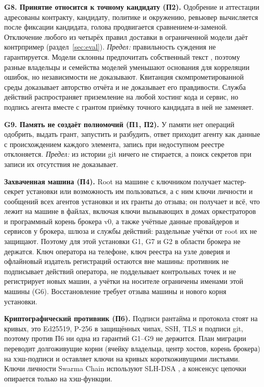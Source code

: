\documentclass[10pt,a4paper]{article}
\begin{document}
\textbf{G8. Принятие относится к точному кандидату (П2).} Одобрение и аттестации адресованы контракту, кандидату, политике и окружению, ревьювер вычисляется после фиксации кандидата, голова продвигается сравнением-и-заменой. Отключение любого из четырёх правил доставки в ограниченной модели даёт контрпример (раздел~\ref{sec:eval}). \emph{Предел:} правильность суждения не гарантируется. Модели склонны предпочитать собственный текст \cite{selfpref,llmjudge}, поэтому разные владельцы и семейства моделей уменьшают основания для корреляции ошибок, но независимости не доказывают. Квитанция скомпрометированной среды доказывает авторство отчёта и не доказывает его правдивости. Служба действий распространяет приземление на любой хостинг кода и сервис, но подпись агента вместе с грантом приёмку точного кандидата в ней не заменяет.

\textbf{G9. Память не создаёт полномочий (П1, П2).} У памяти нет операций одобрить, выдать грант, запустить и разбудить, ответ приходит агенту как данные с происхождением каждого элемента, запись при недоступном реестре отклоняется. \emph{Предел:} из истории git ничего не стирается, а поиск секретов при записи их отсутствия не доказывает.

\textbf{Захваченная машина (П4).} Root на машине с ключником получает мастер-секрет установки или возможность им пользоваться, а с ним ключи личности и сообщений всех агентов установки и их гранты до отзыва; он получает и всё, что лежит на машине в файлах, включая ключи вызывающих в домах оркестраторов и программный корень брокера v0, а также учётные данные провайдеров и сервисов у брокера, шлюза и службы действий: раздельные учётки от root их не защищают. Поэтому для этой установки G1, G7 и G2 в области брокера не держатся. Ключ оператора на телефоне, ключ реестра на узле доверия и офлайновый издатель регистраций остаются вне машины: противник не подписывает действий оператора, не подделывает контрольных точек и не регистрирует новых машин, а учётки на носителе ограничены именами этой машины (G6). Восстановление требует отзыва машины и нового корня установки.

\textbf{Криптографический противник (П6).} Подписи рантайма и протокола стоят на кривых, это Ed25519, P-256 в защищённых чипах, SSH, TLS и подписи git, поэтому против П6 ни одна из гарантий G1--G9 не держится. План миграции переводит долгоживущие корни (ячейку владельца, центр хостов, корень брокера) на хэш-подписи и оставляет ключи на кривых короткоживущими листьями. Ключи личности Swarma Chain используют SLH-DSA \cite{fips205}, а консенсус цепочки опирается только на хэш-функции.
\end{document}
